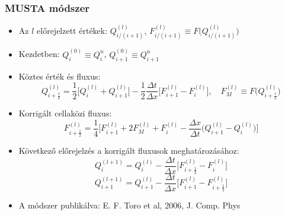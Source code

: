 \documentclass{beamer}
\begin{document}
\begin{frame}
\frametitle{MUSTA módszer}
\begin{itemize}
\item<1-> Az $l$ előrejelzett értékek: $Q^{(l)}_{i/(i+1)}$, $F^{(l)}_{i/(i+1)}\equiv F\big(Q^{(l)}_{i/(i+1)}\big)$
\item<2-> Kezdetben: $Q^{(0)}_i\equiv Q^n_i$,  $Q^{(0)}_{i+1}\equiv Q^{n}_{i+1}$
\item<3-> Köztes érték és fluxus:
\begin{equation*}
Q^{(l)}_{i+\frac{1}{2}}=\frac{1}{2}\Big[Q^{(l)}_i+Q^{(l)}_{i+1}\Big]-\frac{1}{2}\frac{\Delta t}{\Delta x}\Big[F^{(l)}_{i+1}-F^{(l)}_i\Big], \quad F_M^{(l)} \equiv F\big(Q^{(l)}_{i+\frac{1}{2}}\big)
\end{equation*}

\item<3-> Korrigált cellaközi fluxus:
\begin{equation*}
F^{(l)}_{i+\frac{1}{2}}=\frac{1}{4}\Big[F^{(l)}_{i+1}+2F^{(l)}_M+F^{(l)}_{i}-\frac{\Delta x}{\Delta t}\Big(Q^{(l)}_{i+1}-Q^{(l)}_i\Big)\Big]
\end{equation*}
\item<4-> Következő előrejelzés a korrigált fluxusok meghatározásához:
\begin{equation*}
Q_i^{(l+1)}=Q^{(l)}_i-\frac{\Delta t}{\Delta x}\Big[F^{(l)}_{i+\frac{1}{2}}-F^{(l)}_i\Big]
\end{equation*}
\begin{equation*}
Q_{i+1}^{(l+1)}=Q^{(l)}_{i+1}-\frac{\Delta t}{\Delta x}\Big[F^{(l)}_{i+1}-F^{(l)}_{i+\frac{1}{2}}\Big]
\end{equation*}
\item<4-> A módszer publikálva: E. F. Toro et al, 2006, J. Comp. Phys
\end{itemize}
\end{frame}
\end{document}
